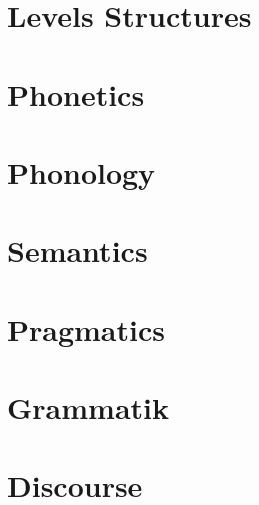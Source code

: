 \documentclass{article}
\begin{document}
\section{Levels Structures}


\section{Phonetics}



\section{Phonology}



\section{Semantics}




\section{Pragmatics}


\section{Grammatik}













\section{Discourse}


















% 
%
\end{document}
